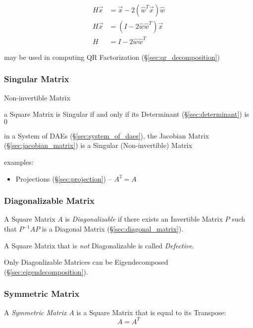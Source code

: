 \begin{align*}
  H\vec{x} & = \vec{x} - 2(\hat{w}^T\vec{x})\hat{w} \\
  H\vec{x} & = (I - 2\hat{w}\hat{w}^T)\vec{x}       \\
         H & = I - 2\hat{w}\hat{w}^T
\end{align*}

\fist may be used in computing QR Factorization (\S\ref{sec:qr_decomposition})



\subsubsection{Singular Matrix}\label{sec:singular_matrix}

Non-invertible Matrix

a Square Matrix is Singular if and only if its Determinant
(\S\ref{sec:determinant}) is $0$

\fist in a System of DAEs (\S\ref{sec:system_of_daes}), the Jacobian Matrix
(\S\ref{sec:jacobian_matrix}) is a Singular (Non-invertible) Matrix

examples:
\begin{itemize}
  \item Projections (\S\ref{sec:projection}) -- $A^2 = A$
\end{itemize}



\subsubsection{Diagonalizable Matrix}\label{sec:diagonalizable_matrix}

A Square Matrix $A$ is \emph{Diagonalizable} if there exists an Invertible
Matrix $P$ such that $P^{-1}AP$ is a Diagonal Matrix
(\S\ref{sec:diagonal_matrix}).

A Square Matrix that is \emph{not} Diagonalizable is called \emph{Defective}.

Only Diagonlizable Matrices can be Eigendecomposed
(\S\ref{sec:eigendecomposition}).



\subsubsection{Symmetric Matrix}\label{sec:symmetric_matrix}

A \emph{Symmetric Matrix} $A$ is a Square Matrix that is equal to its
Transpose:
\[
  A = A^T
\]

